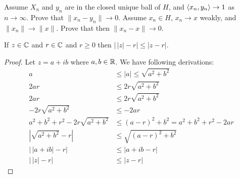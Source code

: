 \begin{enumerate}
\begin{excopy}
\begin{itemize}
Assume \(X_n\) and \(y_n\) are in the closed unique ball of $H$,
and \(\left\langle x_n, y_n \right\rangle \to 1\) as \(n\to\infty\).
Prove that \(\|x_n -y_n\| \to 0\).
Assume \(x_n\in H\), \(x_n\to x\) weakly, and \(\|x_n\| \to \|x\|\).
Prove that then \(\|x_n - x\|\to 0\).
\end{itemize}
\end{excopy}

\begin{llem} \label{llem:mindist-z-real}
If \(z\in\mathbb{C}\) and \(r\in\mathbb{C}\) and \(r\geq 0\)
then \(\left|\,|z| - r\right| \leq |z-r|\). 
\end{llem}
\begin{proof}
Let \(z = a+ib\) where \(a,b\in\mathbb{R}\). We have following derivations:
\begin{align*}
a &\leq |a| \leq \sqrt{a^2+b^2} \\
2ar &\leq 2r\sqrt{a^2+b^2} \\
2ar &\leq 2r\sqrt{a^2+b^2} \\
- 2r\sqrt{a^2+b^2} &\leq - 2ar \\
a^2+b^2+r^2 - 2r\sqrt{a^2+b^2} &\leq (a-r)^2+b^2 = a^2+b^2+r^2 - 2ar \\
\left|\sqrt{a^2+b^2} - r\right| &\leq \sqrt{(a-r)^2+b^2} \\
\left|\,|a + ib| - r\right| &\leq |a+ib-r| \\
\left|\,|z| - r\right| &\leq |z-r|
\end{align*}
\end{proof}


\end{enumerate}
